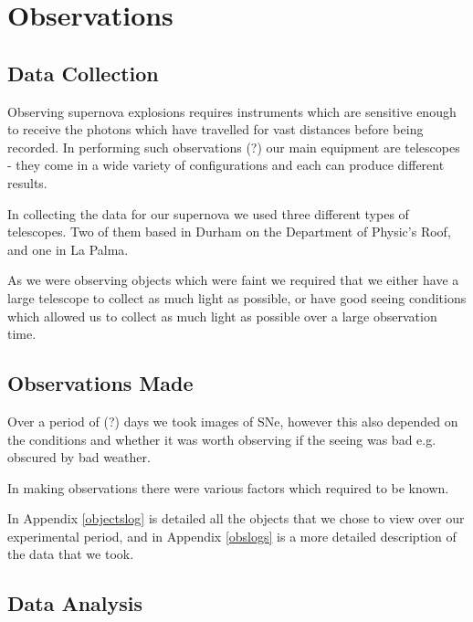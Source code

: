 \documentclass[twocolumn]{revtex4}
\begin{document}
\vspace{-3ex}
\section{Observations} 
\vspace{-2ex}
\subsection{Data Collection}
\vspace{-2ex}

Observing supernova explosions requires instruments which are sensitive enough to receive the photons which have travelled for vast distances before being recorded. In performing such observations (?) our main equipment are telescopes - they come in a wide variety of configurations and each can produce different results.

In collecting the data for our supernova we used three different types of telescopes. Two of them based in Durham on the Department of Physic's Roof, and one in La Palma. 

As we were observing objects which were faint we required that we either have a large telescope to collect as much light as possible, or have good seeing conditions which allowed us to collect as much light as possible over a large observation time.

\vspace{-3ex}
\subsection{Observations Made}
\vspace{-2ex}

Over a period of (?) days we took images of SNe, however this also depended on the conditions and whether it was worth observing if the seeing was bad e.g. obscured by bad weather.

In making observations there were various factors which required to be known.

In Appendix \ref{objectslog} is detailed all the objects that we chose to view over our experimental period, and in Appendix \ref{obslogs} is a more detailed description of the data that we took.

\vspace{-3ex}
\subsection{Data Analysis}
\vspace{-2ex}
\end{document}
